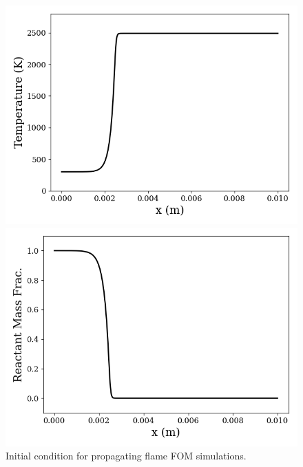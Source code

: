 \begin{figure}
	\begin{minipage}{0.49\linewidth}
		\includegraphics[width=0.99\linewidth]{Chapters/TransientFlame/Images/init_cond_temp.png}
	\end{minipage}
	\begin{minipage}{0.49\linewidth}
		\includegraphics[width=0.99\linewidth]{Chapters/TransientFlame/Images/init_cond_mf.png}
	\end{minipage}
	\caption{\label{fig:flameIC}Initial condition for propagating flame FOM simulations.}
\end{figure}

